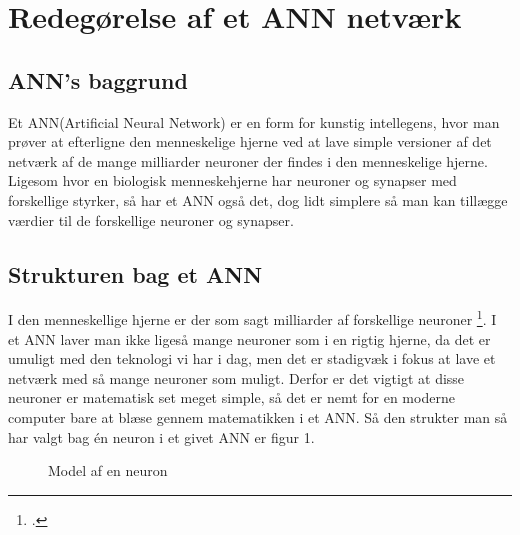 \section{Redegørelse af et ANN netværk}

\subsection{ANN's baggrund}
Et ANN(Artificial Neural Network) er en form for kunstig intellegens, hvor man prøver at efterligne den menneskelige hjerne
ved at lave simple versioner af det netværk af de mange milliarder neuroner der findes i den menneskelige hjerne.
Ligesom hvor en biologisk menneskehjerne har neuroner og synapser med forskellige styrker, så har et ANN også det, dog lidt simplere
så man kan tillægge værdier til de forskellige neuroner og synapser.

\subsection{Strukturen bag et ANN}
I den menneskellige hjerne er der som sagt milliarder af forskellige neuroner \footcite{DDOhjerne}.
I et ANN laver man ikke ligeså mange
neuroner som i en rigtig hjerne, da det er umuligt med den teknologi vi har i dag, men det er stadigvæk i fokus at lave et netværk med så mange neuroner
som muligt.
Derfor er det vigtigt at disse neuroner er matematisk set meget simple, så det er nemt for en moderne computer bare at blæse gennem matematikken
i et ANN. Så den strukter man så har valgt bag én neuron i et givet ANN er figur 1.

\begin{figure}
\label{neuron}
\caption{Model af en neuron}

\end{figure}

